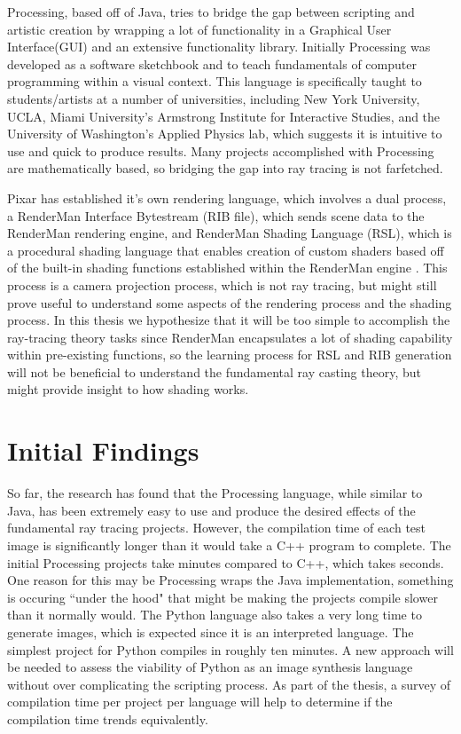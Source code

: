 \documentclass{article}
\begin{document}
Processing, based off of Java, tries to bridge the gap between scripting and artistic creation by wrapping a lot of functionality in a Graphical User Interface(GUI) and an extensive functionality library\cite{glassner2010processing}.  Initially Processing was developed as a software sketchbook and to teach fundamentals of computer programming within a visual context.  This language is specifically taught to students/artists at a number of universities, including New York University, UCLA, Miami University's Armstrong Institute for Interactive Studies, and the University of Washington's Applied Physics lab, which suggests it is intuitive to use and quick to produce results.  Many projects accomplished with Processing are mathematically based, so bridging the gap into ray tracing is not farfetched.

Pixar has established it's own rendering language, which involves a dual process, a RenderMan Interface Bytestream (RIB file), which sends scene data to the RenderMan rendering engine, and RenderMan Shading Language (RSL), which is a procedural shading language that enables creation of custom shaders based off of the built-in shading functions established within the RenderMan engine \cite{cook1984shade}.  This process is a camera projection process, which is not ray tracing, but might still prove useful to understand some aspects of the rendering process and the shading process.  In this thesis we hypothesize that it will be too simple to accomplish the ray-tracing theory tasks since RenderMan encapsulates a lot of shading capability within pre-existing functions, so the learning process for RSL and RIB generation will not be beneficial to understand the fundamental ray casting theory, but might provide insight to how shading works.
\section{Initial Findings}
So far, the research has found that the Processing language, while similar to Java, has been extremely easy to use and produce the desired effects of the fundamental ray tracing projects. However, the compilation time of each test image is significantly longer than it would take a C++ program to complete.  The initial Processing projects take minutes compared to C++, which takes seconds. One reason for this may be Processing wraps the Java implementation, something is occuring ``under the hood" that might be making the projects compile slower than it normally would.  The Python language also takes a very long time to generate images, which is expected since it is an interpreted language.  The simplest project for Python compiles in roughly ten minutes.  A new approach will be needed to assess the viability of Python as an image synthesis language without over complicating the scripting process.  As part of the thesis, a survey of compilation time per project per language will help to determine if the compilation time trends equivalently.
\end{document}
